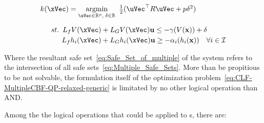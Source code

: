 \begin{equation}
    \begin{array}{l}
        k(\xVec) = \underset{\uVec \in \mathbb{R}^p, \hspace{0.2em} \delta \in \mathbb{R}}{\mathrm{argmin}} \quad \hspace{-0.5em} \frac{1}{2} (\uVec^\top R \uVec + p\delta^2 ) \vspace{1em} \\ 
        \quad \hspace{0.5em}  st. \hspace{0.5em} L_fV(\xVec) + L_GV(\xVec)\mathbf{u} \leq -\gamma(V(\mathbf{x})) + \delta \vspace{0.25em}\\
        \quad \quad \hspace{1em}                 L_fh_i(\xVec) + L_Gh_i(\xVec)\mathbf{u} \geq -\alpha_i(h_i(\mathbf{x}))  \quad \forall i \in \mathcal{I}    
    \end{array}
 \label{eq:CLF-MultipleCBF-QP-relaxed-generic}
\end{equation}

Where the resultant safe set~\ref{eq:Safe_Set_of_multiple} of the system refers to the intersection of all safe sets~\ref{eq:Multiple_Safe_Sets}. More than be propitious to be not solvable, the formulation itself of the optimization problem~\ref{eq:CLF-MultipleCBF-QP-relaxed-generic} is limitated by no other logical operation than AND. \par

Among the the logical operations that could be applied to s, there are:

